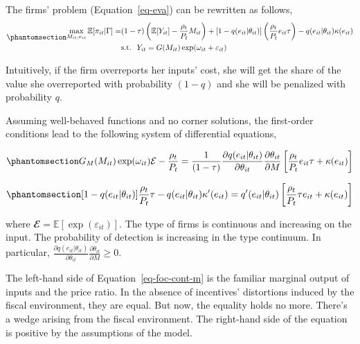 \documentclass[
  12pt]{article}
\theoremstyle{definition}
\theoremstyle{remark}
\begin{document}
The firms' problem (Equation~\ref{eq-eva}) can be rewritten as follows,
\begin{equation}\phantomsection\label{eq-eva-2}{
\begin{aligned}
  \max_{M_{it},e_{it}} \mathbb{E}[\pi_{it}|\Gamma] = &(1-\tau)\left(\mathbb{E}[Y_{it}]-\frac{\rho_{t}}{P_t} M_{it}\right)+[1-q(e_{it}|\theta_{it})]\left(\frac{\rho_{t}}{P_t}e_{it}\tau\right)
  -q(e_{it}|\theta_{it})\kappa(e_{it}) \\
  &\text{s.t. }\; Y_{it}=G(M_{it})\exp(\omega_{it}+\varepsilon_{it})
\end{aligned}
}\end{equation}

Intuitively, if the firm overreports her inputs' cost, she will get the
share of the value she overreported with probability \((1-q)\) and she
will be penalized with probability \(q\).

Assuming well-behaved functions and no corner solutions, the first-order
conditions lead to the following system of differential equations,

\begin{equation}\phantomsection\label{eq-foc-cont-m}{
G_M(M_{it})\exp(\omega_{it})\mathcal{E}-\frac{\rho_{t}}{P_t} = \frac{1}{(1-\tau)}\frac{\partial q(e_{it}|\theta_{it})}{\partial \theta_{it}}\frac{\partial \theta_{it}}{\partial M}\left[\frac{\rho_t}{P_t}e_{it}\tau+\kappa(e_{it})\right]
}\end{equation}

\begin{equation}\phantomsection\label{eq-foc-cont-e}{
[1-q(e_{it}|\theta_{it})]\frac{\rho_t}{P_t}\tau-q(e_{it}|\theta_{it})\kappa'(e_{it})=q'(e_{it}|\theta_{it})\left[\frac{\rho_t}{P_t}\tau e_{it} + \kappa(e_{it})\right]
}\end{equation}

where \(\mathbfcal{E}=\mathbb{E}[\exp(\varepsilon_{it})]\). The type of
firms is continuous and increasing on the input. The probability of
detection is increasing in the type continuum. In particular,
\(\frac{\partial q(e_{it}|\theta_{it})}{\partial \theta_{it}}\frac{\partial \theta_{it}}{\partial M}\ge0\).

The left-hand side of Equation~\ref{eq-foc-cont-m} is the familiar
marginal output of inputs and the price ratio. In the absence of
incentives' distortions induced by the fiscal environment, they are
equal. But now, the equality holds no more. There's a wedge arising from
the fiscal environment. The right-hand side of the equation is positive
by the assumptions of the model.
\end{document}
